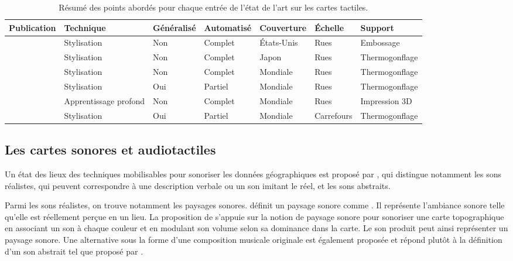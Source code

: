 \begin{table}
\begin{center}
\scriptsize
\begin{tabular}{ | l | l | l | l | l | l | l | }
    Publication & Technique & Généralisé & Automatisé & Couverture & Échelle & Support \tabularnewline
    \hline
    \cite{Miele2004} & Stylisation & Non & Complet & États-Unis & Rues & Embossage \tabularnewline
    \cite{Minatani2010} & Stylisation & Non & Complet & Japon & Rues & Thermogonflage \tabularnewline
    \cite{Watanabe2014, Cervenka2016} & Stylisation & Non & Complet & Mondiale & Rues & Thermogonflage \tabularnewline
    \cite{Stampach2016} & Stylisation & Oui & Partiel & Mondiale & Rues & Thermogonflage \tabularnewline
    \cite{FillieresRiveau2020} & Apprentissage profond & Non & Complet & Mondiale & Rues & Impression 3D \tabularnewline
    \cite{Jiang2023} & Stylisation & Oui & Partiel & Mondiale & Carrefours & Thermogonflage \tabularnewline
\end{tabular}
\end{center}
\caption{Résumé des points abordés pour chaque entrée de l'état de l'art sur les cartes tactiles.}
\label{tab:ea_relief}
\end{table}


\label{ea_cartetactile}

\subsection{Les cartes sonores et audiotactiles}

\label{ea_cartessonores}

Un état des lieux des techniques mobilisables pour sonoriser les données géographiques est proposé par \cite{Krygier1994}, qui distingue notamment les sons réalistes, qui peuvent correspondre à une description verbale ou un son imitant le réel, et les sons abstraits.

\newpar{}


Parmi les sons réalistes, on trouve notamment les paysages sonores. \cite{Porteous1985} définit un paysage sonore comme . Il représente l'ambiance sonore telle qu'elle est réellement perçue en un lieu. La proposition de \cite{Josselin2016} s'appuie sur la notion de paysage sonore pour sonoriser une carte topographique en associant un son à chaque couleur et en modulant son volume selon sa dominance dans la carte. Le son produit peut ainsi représenter un paysage sonore. Une alternative sous la forme d'une composition musicale originale est également proposée et répond plutôt à la définition d'un son abstrait tel que proposé par \cite{Krygier1994}.

